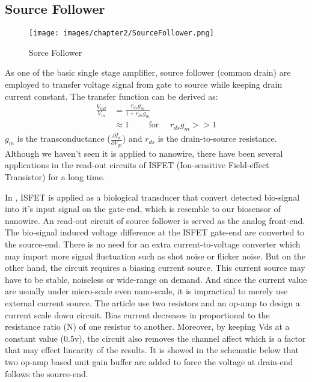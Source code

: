 \subsection{Source Follower}

\begin{figure}[h]
    \centering
    \texttt{[image: images/chapter2/SourceFollower.png]}
    \fontsize{6}{7}\selectfont
    \caption{Sorce Follower}
    \label{fig:SF}
\end{figure}

As one of the basic single stage amplifier, source follower (common drain) are employed to transfer voltage signal from gate to source while keeping drain current constant.
The transfer function can be derived as:
\setlength{\mathindent}{5.5cm}
\begin{align}
    \frac{V_{out}}{V_{in}} & = \frac{r_{ds}g_m}{1 + r_{ds}g_m} \\    \label{eq:sfTF}
                           & \approx 1 \qquad \text{ for } \quad r_{ds}g_m >> 1
\end{align}
$g_m$ is the transconductance ($\frac{\partial I_d}{\partial V_{gs}}$) and $r_{ds}$ is the drain-to-source resistance.
Although we haven't seen it is applied to nanowire, there have been several applications in the read-out circuits of ISFET (Ion-sensitive Field-effect Transistor)\cite{SF1, SF2} for a long time.



In \cite{SF1}, ISFET is applied as a biological transducer that convert detected bio-signal into it's input signal on the gate-end, which is resemble to our biosensor of nanowire.
An read-out circuit of source follower is served as the analog front-end.
The bio-signal induced voltage difference at the ISFET gate-end are converted to the source-end.
There is no need for an extra current-to-voltage converter which may import more signal fluctuation such as shot noise or flicker noise.
But on the other hand, the circuit requires a biasing current source.
This current source may have to be stable, noiseless or wide-range on demand.
And since the current value are usually under micro-scale even nano-scale, it is impractical to merely use external current source.
The article use two resistors and an op-amp to design a current scale down circuit.
Bias current decreases in proportional to the resistance ratio (N) of one resistor to another.
Moreover, by keeping Vds at a constant value (0.5v), the circuit also removes {\color{red}the channel affect which is a factor that may effect linearity of the results.}
It is showed in the schematic below that two op-amp based unit gain buffer are added to force the voltage at drain-end follows the source-end.

